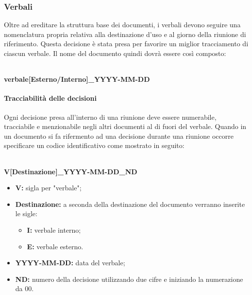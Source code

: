   
  \subsubsection{Verbali}
  Oltre ad ereditare la struttura base dei documenti, i verbali devono seguire
  una nomenclatura propria relativa alla destinazione d'uso e al giorno della riunione di riferimento.
  Questa decisione è stata presa per favorire un miglior tracciamento di ciascun verbale.
  Il nome del documento quindi dovrà essere così composto:\\\\
  \centerline{\textbf{verbale[Esterno/Interno]\_YYYY-MM-DD}} 
  

    \paragraph{Tracciabilità delle decisioni}
      Ogni decisione presa all'interno di una riunione deve essere numerabile, tracciabile e menzionabile negli altri documenti al di fuori del verbale. Quando in un documento si fa rifermento ad una decisione durante una riunione
      occorre specificare un codice identificativo come mostrato in seguito:\\\\
      \centerline{\textbf{V[Destinazione]\_YYYY-MM-DD\_ND}} 
      \begin{itemize}
      	\item \textbf{V:} sigla per "verbale";
      	\item \textbf{Destinazione:} a seconda della destinazione del documento verranno inserite le sigle:
      	\begin{itemize}
      		\item \textbf{I:} verbale interno;
      		\item \textbf{E:} verbale esterno.
      	\end{itemize}
      	\item \textbf{YYYY-MM-DD:} data del verbale;
      	\item \textbf{ND:} numero della decisione utilizzando due cifre e iniziando la numerazione da 00.
      \end{itemize}
  
